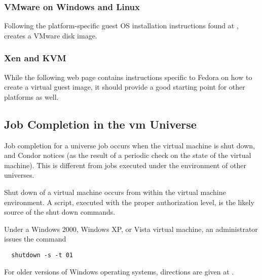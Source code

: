 \subsubsection{\label{sec:vm-disk-image-details-vmware}
VMware on Windows and Linux}



Following the platform-specific
guest OS installation instructions found at
,
creates a VMware disk image.

\subsubsection{\label{sec:vm-disk-image-details-xen}Xen and KVM}
While the following web page contains instructions specific to
Fedora on how to create a virtual guest image,
it should provide a good starting point for 
other platforms as well.


\subsection{\label{sec:vm-job-completion-details}Job Completion in the vm Universe}

Job completion for a  universe job occurs when 
the virtual machine is shut down, and Condor notices 
(as the result of a periodic check on the state of the virtual machine).
This is different from jobs executed under the environment of other 
universes.

Shut down of a virtual machine occurs from within the virtual
machine environment.
A script, executed with the proper authorization level,
is the likely source of the shut down commands.

Under a Windows 2000, Windows XP, or Vista virtual machine,
an administrator issues the command
\begin{verbatim}
  shutdown -s -t 01
\end{verbatim}
For older versions of Windows operating systems, 
directions are given at
.

